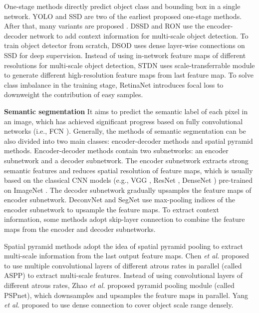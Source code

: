 \documentclass[10pt,twocolumn,letterpaper]{article}
\begin{document}
One-stage methods directly predict object class and bounding box in a single network.  YOLO \cite{Redmon_YOLO_CVPR_2016} and SSD \cite{Liu_SSD_ECCV_2016} are two of the earliest proposed one-stage methods. After that, many variants are proposed \cite{Fu_DSSD_arXiv_2017,Kong_RON_CVPR_2017,Shen_DSOD_ICCV_2017,Zhou_STDN_CVPR_2018}. DSSD \cite{Fu_DSSD_arXiv_2017} and RON \cite{Kong_RON_CVPR_2017} use the encoder-decoder network to add context information for multi-scale object detection. To train object detector from scratch, DSOD \cite{Shen_DSOD_ICCV_2017} uses dense layer-wise connections on SSD for deep supervision. Instead of using in-network feature maps of different resolutions for multi-scale object detection, STDN \cite{Zhou_STDN_CVPR_2018} uses scale-transferrable module to generate different high-resolution feature maps from last feature map. To solve class imbalance in the training stage, RetinaNet \cite{Lin_Focal_ICCV_2017} introduces focal loss to downweight the contribution of easy samples.

\textbf{Semantic segmentation} It aims to predict the semantic label of each pixel in an image, which has achieved significant progress based on fully convolutional networks (i.e., FCN \cite{Long_FCN_CVPR_2015}). Generally, the methods of semantic segmentation can be also divided into two main classes: encoder-decoder methods and spatial pyramid methods. Encoder-decoder methods contain two subnetworks: an encoder subnetwork and a decoder subnetwork. The encoder subnetwork extracts strong semantic features and reduces spatial resolution of feature maps, which is usually based on the classical CNN models (e.g., VGG \cite{Simonyan_VGG_arXiv_2014}, ResNet \cite{He_ResNet_CVPR_2016}, DenseNet \cite{Huang_DenseNet_CVPR_2017}) pre-trained on ImageNet \cite{Russakovsky_ImageNet_IJCV_2015}. The decoder subnetwork gradually upsamples the feature maps of encoder subnetwork. DeconvNet \cite{Noh_DeconvNet_ICCV_2015} and SegNet \cite{Badrinarayanan_SegNet_PAMI_2017} use max-pooling indices of the encoder subnetwork to upsample the feature maps. To extract context information, some methods \cite{Peng_Largekernl_CVPR_2017,Lin_Refinenet_CVPR_2017,Yu_DFN_CVPR_2018} adopt skip-layer connection to combine the feature maps from the encoder and decoder subnetworks.


Spatial pyramid methods adopt the idea of spatial pyramid pooling \cite{He_SPP_ECCV_2014} to extract multi-scale information from the last output feature maps. Chen \textit{et al.} \cite{Chen_Deeplab_PAMI_2017,Chen_Deeplabv3_arXiv_2017,Wang_DUC_WACV_2017,Yang_DenseASPP_CVPR_2018} proposed to use multiple convolutional layers of different atrous rates in parallel (called ASPP) to extract multi-scale features. Instead of using convolutional layers of different atrous rates, Zhao \textit{et al.} \cite{Zhao_PSPNet_CVPR_2017} proposed pyramid pooling module (called PSPnet), which downsamples and upsamples the feature maps in parallel. Yang \textit{et al.} \cite{Yang_DenseASPP_CVPR_2018} proposed to use dense connection to cover object scale range densely.
\end{document}
